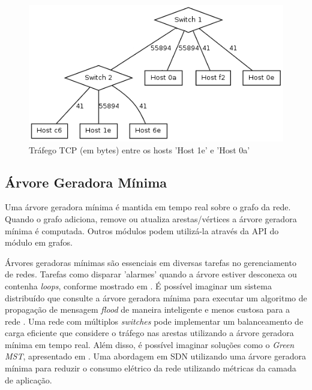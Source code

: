 \begin{figure}[h!]
    \centering
    \includegraphics[scale=0.8]{graph_iperf.png}
    \caption{Tráfego TCP (em bytes) entre os hosts ’Host 1e’ e ’Host 0a’}
    \label{fig:iperf}
\end{figure}

\subsection{Árvore Geradora Mínima}
Uma árvore geradora mínima é mantida em tempo real sobre o grafo
da rede. 
Quando o grafo adiciona, remove ou atualiza arestas/vértices a árvore 
geradora mínima é computada. 
Outros módulos podem utilizá-la através da API do módulo em grafos.

Árvores geradoras mínimas são essenciais em diversas tarefas no gerenciamento
de redes.
Tarefas como disparar 'alarmes' quando a árvore estiver desconexa ou 
contenha \emph{loops}, conforme mostrado em \citep{schmid2013exploiting}.
É possível imaginar um sistema distribuído que consulte a árvore geradora
mínima para executar um algoritmo de propagação de mensagem \emph{flood} 
de maneira inteligente e menos custosa para 
a rede \citep{Monsanto:2013:CSN:2482626.2482629}.
Uma rede com múltiplos \emph{switches} pode implementar um 
balanceamento de carga eficiente que considere o tráfego nas arestas
utilizando a árvore geradora mínima em tempo real.
Além disso, é possível imaginar soluções como o \emph{Green MST}, 
apresentado em \citep{prete2012energy}. 
Uma abordagem em SDN utilizando uma árvore geradora mínima 
para reduzir o consumo elétrico da rede utilizando métricas da 
camada de aplicação. 
